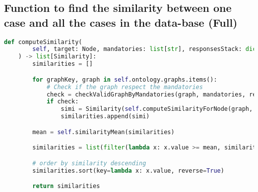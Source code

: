 \clearpage
\subsection{Function to find the similarity between one case and all the cases in the data-base (Full)\label{annex:comp-sim-full}}
\begin{lstlisting}[language=Python, caption=Function to find the similarity between one case and all the cases in the data-base (Full), label={lst:comp-sim-full}]
def computeSimilarity(
        self, target: Node, mandatories: list[str], responsesStack: dict[str, Any]
    ) -> list[Similarity]:
        similarities = []

        for graphKey, graph in self.ontology.graphs.items():
            # Check if the graph respect the mandatories
            check = checkValidGraphByMandatories(graph, mandatories, responsesStack)
            if check:
                simi = Similarity(self.computeSimilarityForNode(graph, target), graph)
                similarities.append(simi)

        mean = self.similarityMean(similarities)

        similarities = list(filter(lambda x: x.value >= mean, similarities))

        # order by similarity descending
        similarities.sort(key=lambda x: x.value, reverse=True)

        return similarities
\end{lstlisting}



\clearpage
